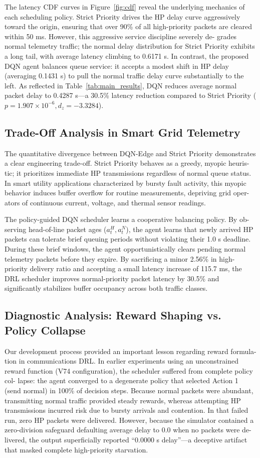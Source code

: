 \documentclass[runningheads,a4paper]{llncs}
\begin{document}
The latency CDF curves in Figure~\ref{fig:cdf} reveal the underlying mechanics
of each scheduling policy. Strict Priority drives the HP delay curve aggressively
toward the origin, ensuring that over 90\% of all high-priority packets are
cleared within 50 ms. However, this aggressive service discipline severely de-
grades normal telemetry traffic; the normal delay distribution for Strict Priority
exhibits a long tail, with average latency climbing to 0.6171 s. In contrast,
the proposed DQN agent balances queue service: it accepts a modest shift in HP
delay (averaging 0.1431 s) to pull the normal traffic delay curve substantially
to the left. As reflected in Table~\ref{tab:main_results}, DQN reduces average
normal packet delay to 0.4287 s—a 30.5\% latency reduction compared to Strict
Priority ($p = 1.907 \times 10^{-6}, d_z = -3.3284$).

\subsection{Trade-Off Analysis in Smart Grid Telemetry}
The quantitative divergence between DQN-Edge and Strict Priority demonstrates a
clear engineering trade-off. Strict Priority behaves as a greedy, myopic heuris-
tic; it prioritizes immediate HP transmissions regardless of normal queue status.
In smart utility applications characterized by bursty fault activity, this myopic
behavior induces buffer overflow for routine measurements, depriving grid oper-
ators of continuous current, voltage, and thermal sensor readings.

The policy-guided DQN scheduler learns a cooperative balancing policy. By ob-
serving head-of-line packet ages ($a_t^H, a_t^N$), the agent learns that newly
arrived HP packets can tolerate brief queuing periods without violating their
1.0 s deadline. During these brief windows, the agent opportunistically clears
pending normal telemetry packets before they expire. By sacrificing a minor
2.56\% in high-priority delivery ratio and accepting a small latency increase of
115.7 ms, the DRL scheduler improves normal-priority packet latency by 30.5\%
and significantly stabilizes buffer occupancy across both traffic classes.

\subsection{Diagnostic Analysis: Reward Shaping vs. Policy Collapse}
Our development process provided an important lesson regarding reward formula-
tion in communications DRL. In earlier experiments using an unconstrained reward
function (V74 configuration), the scheduler suffered from complete policy col-
lapse: the agent converged to a degenerate policy that selected Action 1 (send
normal) in 100\% of decision steps. Because normal packets were abundant,
transmitting normal traffic provided steady rewards, whereas attempting HP
transmissions incurred risk due to bursty arrivals and contention. In that failed
run, zero HP packets were delivered. However, because the simulator contained a
zero-division safeguard defaulting average delay to 0.0 when no packets were de-
livered, the output superficially reported ``0.0000 s delay''—a deceptive artifact
that masked complete high-priority starvation.
\end{document}
